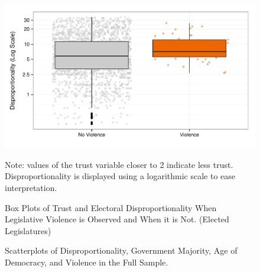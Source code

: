 \documentclass[a4paper]{article}\usepackage{graphicx, color}
\newenvironment{knitrout}{}{} %
\begin{document}
{{%
\begin{figure}[t]
    \caption{Box Plots of Trust and Electoral Disproportionality When Legislative Violence is Observed and When it is Not. (Elected Legislatures)}  
    \label{BoxPlot}
    \begin{center}

\begin{knitrout}
\color{fgcolor}\includegraphics[width=0.8\linewidth]{figure/boxplot} 
\end{knitrout}

    \end{center}
    \begin{singlespace}
        {\scriptsize{Note: values of the trust variable closer to 2 indicate less trust. Disproportionality is displayed using a logarithmic scale to ease interpretation. }}
    \end{singlespace}
\end{figure}

\begin{figure}[t]
    \caption{Scatterplots of Disproportionality, Government Majority, Age of Democracy, and Violence in the Full Sample.}  
    \label{framework_empirical}
    \begin{center}


\end{center}
\end{figure}}}
\end{document}
